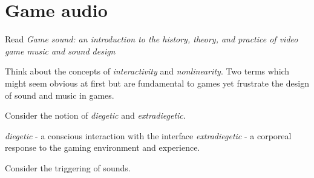 
\chapter{Game audio}
\label{games}


Read \textit{Game sound: an introduction to the history, theory, and practice of video game music and sound design} \citeyearpar{collins2008game}

Think about the concepts of \textit{interactivity} and \textit{nonlinearity}. Two terms which might seem obvious at first but are fundamental to games yet frustrate the design of sound and music in games. 

Consider the notion of \textit{diegetic} and \textit{extradiegetic}. 
\begin{itemize}
\textit{diegetic} - a conscious interaction with the interface
\textit{extradiegetic} - a corporeal response to the gaming environment and experience. 
\end{itemize}

Consider the triggering of sounds. 
